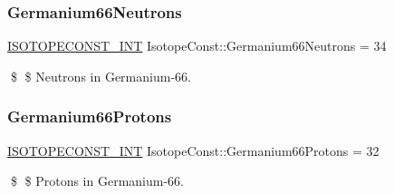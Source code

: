 \subsubsection{\texorpdfstring{Germanium66\+Neutrons}{Germanium66Neutrons}}
{\footnotesize\ttfamily \mbox{\hyperlink{group___isotope_const-_macros_ga5f18360b3e99483a35c32d789e62621c}{I\+S\+O\+T\+O\+P\+E\+C\+O\+N\+S\+T\+\_\+\+I\+NT}} Isotope\+Const\+::\+Germanium66\+Neutrons = 34}

\$ \$ Neutrons in Germanium-\/66. \mbox{\label{group___isotope_const-_germanium-_ge66_ga744d5f88e3d364402db3495313bf35b3}} 
\subsubsection{\texorpdfstring{Germanium66\+Protons}{Germanium66Protons}}
{\footnotesize\ttfamily \mbox{\hyperlink{group___isotope_const-_macros_ga5f18360b3e99483a35c32d789e62621c}{I\+S\+O\+T\+O\+P\+E\+C\+O\+N\+S\+T\+\_\+\+I\+NT}} Isotope\+Const\+::\+Germanium66\+Protons = 32}

\$ \$ Protons in Germanium-\/66. 